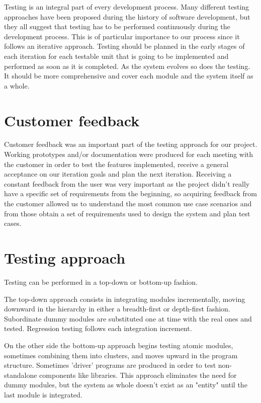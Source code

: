 
Testing is an integral part of every development process.
Many different testing approaches have been proposed during the history of
software development, but they all suggest that testing has to be performed continuously
during the development process. This is of particular importance to our process since
it follows an iterative approach. Testing should be planned in the early stages of each
iteration for each testable unit that is going to be implemented and performed as soon as
it is completed. As the system evolves so does the testing. It should be more comprehensive
and cover each module and the system itself as a whole.

\section{Customer feedback}
Customer feedback was an important part of the testing approach for our project.
Working prototypes and/or documentation were produced for each meeting with the customer
in order to test the features implemented, receive a general acceptance on our iteration goals
and plan the next iteration. Receiving a constant feedback from the user was very important as the
project didn't really have a specific set of requirements from the beginning, so acquiring feedback
from the customer allowed us to understand the most common use case scenarios and from those obtain
a set of requirements used to design the system and plan test cases.

\section{Testing approach}
Testing can be performed in a top-down or bottom-up fashion.

The top-down approach consists in integrating modules incrementally, moving downward in 
the hierarchy in either a breadth-first or depth-first fashion. Subordinate dummy modules are 
substituted one at time with the real ones and tested. Regression testing follows each integration increment.

On the other side the bottom-up approach begins testing atomic modules, sometimes combining them into clusters,
and moves upward in the program structure. Sometimes 'driver' programs are produced in order to test
non-standalone components like libraries. This approach eliminates the need for dummy modules, but the
system as whole doesn't exist as an "entity" until the last module is integrated.

